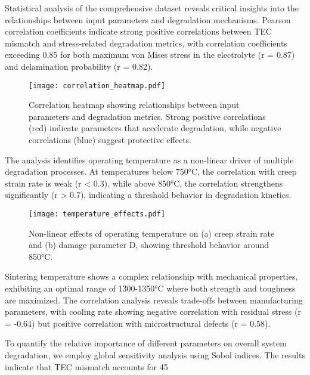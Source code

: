 \documentclass[10pt,conference]{IEEEtran}
\begin{document}
Statistical analysis of the comprehensive dataset reveals critical insights into the relationships between input parameters and degradation mechanisms. Pearson correlation coefficients indicate strong positive correlations between TEC mismatch and stress-related degradation metrics, with correlation coefficients exceeding 0.85 for both maximum von Mises stress in the electrolyte (r = 0.87) and delamination probability (r = 0.82).

\begin{figure}[H]
\centering
\texttt{[image: correlation\_heatmap.pdf]}
\caption{Correlation heatmap showing relationships between input parameters and degradation metrics. Strong positive correlations (red) indicate parameters that accelerate degradation, while negative correlations (blue) suggest protective effects.}
\label{fig:correlation_heatmap}
\end{figure}

The analysis identifies operating temperature as a non-linear driver of multiple degradation processes. At temperatures below 750°C, the correlation with creep strain rate is weak (r < 0.3), while above 850°C, the correlation strengthens significantly (r > 0.7), indicating a threshold behavior in degradation kinetics.

\begin{figure}[H]
\centering
\texttt{[image: temperature\_effects.pdf]}
\caption{Non-linear effects of operating temperature on (a) creep strain rate and (b) damage parameter D, showing threshold behavior around 850°C.}
\label{fig:temperature_effects}
\end{figure}

Sintering temperature shows a complex relationship with mechanical properties, exhibiting an optimal range of 1300-1350°C where both strength and toughness are maximized. The correlation analysis reveals trade-offs between manufacturing parameters, with cooling rate showing negative correlation with residual stress (r = -0.64) but positive correlation with microstructural defects (r = 0.58).

To quantify the relative importance of different parameters on overall system degradation, we employ global sensitivity analysis using Sobol indices. The results indicate that TEC mismatch accounts for 45%
\end{document}
